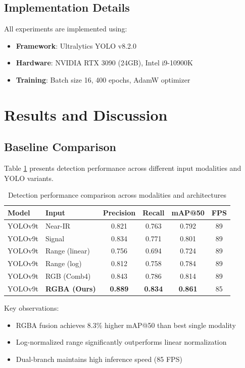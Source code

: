 \documentclass[runningheads]{llncs}
\begin{document}
\subsection{Implementation Details}

All experiments are implemented using:
\begin{itemize}
    \item \textbf{Framework}: Ultralytics YOLO v8.2.0
    \item \textbf{Hardware}: NVIDIA RTX 3090 (24GB), Intel i9-10900K
    \item \textbf{Training}: Batch size 16, 400 epochs, AdamW optimizer
\end{itemize}

\section{Results and Discussion}

\subsection{Baseline Comparison}

Table \ref{tab:baseline_comparison} presents detection performance across different input modalities and YOLO variants.

\begin{table}[h]
\centering
\caption{Detection performance comparison across modalities and architectures}
\label{tab:baseline_comparison}
\begin{tabular}{llcccc}
\toprule
\textbf{Model} & \textbf{Input} & \textbf{Precision} & \textbf{Recall} & \textbf{mAP@50} & \textbf{FPS} \\
\midrule
YOLOv9t & Near-IR & 0.821 & 0.763 & 0.792 & 89 \\
YOLOv9t & Signal & 0.834 & 0.771 & 0.801 & 89 \\
YOLOv9t & Range (linear) & 0.756 & 0.694 & 0.724 & 89 \\
YOLOv9t & Range (log) & 0.812 & 0.758 & 0.784 & 89 \\
YOLOv9t & RGB (Comb4) & 0.843 & 0.786 & 0.814 & 89 \\
\rowcolor{bestgreen!20}
YOLOv9t & \textbf{RGBA (Ours)} & \textbf{0.889} & \textbf{0.834} & \textbf{0.861} & 85 \\
\bottomrule
\end{tabular}
\end{table}

Key observations:
\begin{itemize}
    \item RGBA fusion achieves 8.3\% higher mAP@50 than best single modality
    \item Log-normalized range significantly outperforms linear normalization
    \item Dual-branch maintains high inference speed (85 FPS)
\end{itemize}
\end{document}
